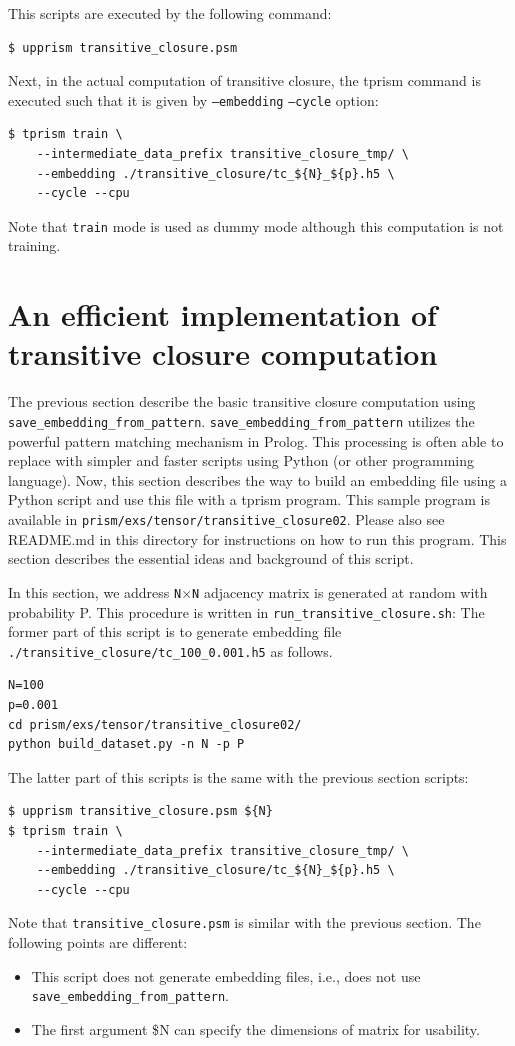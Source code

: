 \documentclass[a4paper]{report}
\begin{document}
This scripts are executed by the following command: 
\begin{verbatim}
$ upprism transitive_closure.psm
\end{verbatim}

Next, in the actual computation of transitive closure, the tprism command is executed such that it is given by {\tt --embedding}  {\tt --cycle} option:
\begin{verbatim}
$ tprism train \
    --intermediate_data_prefix transitive_closure_tmp/ \
    --embedding ./transitive_closure/tc_${N}_${p}.h5 \
    --cycle --cpu
\end{verbatim}
Note that {\tt train} mode is used as dummy mode although this computation is not training.


\section{An efficient implementation of transitive closure computation}
\label{sec:transitive_closure02}

The previous section describe the basic transitive closure computation using 
{\tt save\_embedding\_from\_pattern}.
{\tt save\_embedding\_from\_pattern} utilizes the powerful pattern matching mechanism in Prolog.
This processing is often able to replace with simpler and faster scripts using Python (or other programming language).
Now, this section describes the way to build an embedding file using a Python script and use this file with a tprism program.
This sample program is available in \verb|prism/exs/tensor/transitive_closure02|.
Please also see README.md in this directory for instructions on how to run this program.
This section describes the essential ideas and background of this script. 

In this section, we address {\tt N}$\times${\tt N} adjacency matrix is generated at random with probability P.
This procedure is written in {\tt run\_transitive\_closure.sh}:
The former part of this script is to generate embedding file {\tt ./transitive\_closure/tc\_100\_0.001.h5} as follows.
\begin{verbatim}
N=100
p=0.001
cd prism/exs/tensor/transitive_closure02/
python build_dataset.py -n N -p P
\end{verbatim}

The latter part of this scripts is the same with the previous section scripts:
\begin{verbatim}
$ upprism transitive_closure.psm ${N}
$ tprism train \
    --intermediate_data_prefix transitive_closure_tmp/ \
    --embedding ./transitive_closure/tc_${N}_${p}.h5 \
    --cycle --cpu
\end{verbatim}
Note that {\tt transitive\_closure.psm} is similar with the previous section.
The following points are different:
\begin{itemize}
	\item This script does not generate embedding files, i.e., does not use {\tt save\_embedding\_from\_pattern}.
	\item The first argument \${N} can specify the dimensions of matrix for usability.
\end{itemize}
\end{document}
